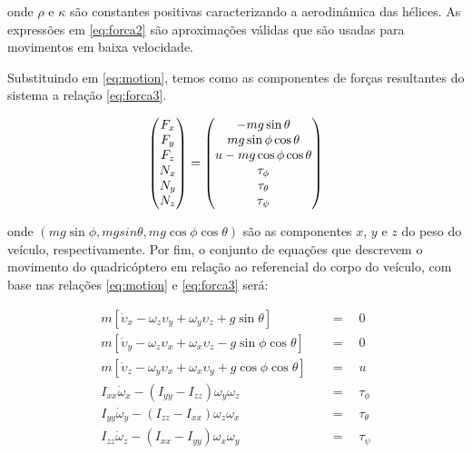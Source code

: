 \documentclass[a4paper, 12pt]{article}
\begin{document}
\noindent onde $\rho$ e $\kappa$ são constantes positivas caracterizando a aerodinâmica das hélices. As expressões em \ref{eq:forca2} são aproximações válidas que são usadas para movimentos em baixa velocidade. 

Substituindo em \ref{eq:motion}, temos como as componentes de forças resultantes do sistema a relação \ref{eq:forca3}. 

\begin{equation}
\centering
\begin{pmatrix}
	F_x \\ F_y \\ F_z \\ N_x \\ N_y \\ N_z 
\end{pmatrix} = 
\begin{pmatrix}
-mg\sin{\theta} \\ mg\sin{\phi}\cos{\theta} \\ u - mg\cos{\phi}\cos{\theta} \\ \tau_{\phi} \\ \tau_{\theta} \\ \tau_{\psi} 
\end{pmatrix}
\label{eq:forca3}
\end{equation}

\noindent onde $(mg\sin{\phi},mgsin{\theta},mg\cos{\phi}\cos{\theta})$ são as componentes $x$, $y$ e $z$ do peso do veículo, respectivamente. Por fim, o conjunto de equações que descrevem o movimento do quadricóptero em relação ao referencial do corpo do veículo, com base nas relações \ref{eq:motion} e \ref{eq:forca3} será:

\begin{equation}
\begin{aligned}
	m\left[ { \dot { \upsilon  }  }_{ x } - { \omega  }_{ z }\upsilon_{ y } + { \omega  }_{ y }{ \upsilon  }_{ z } + g\sin{\theta} \right] \quad &=\quad 0 \\ 
	m\left[ { \dot { \upsilon  }  }_{ y } - { \omega  }_{ z }\upsilon_{ x } + { \omega  }_{ x }{ \upsilon  }_{ z } - g\sin{\phi}\cos{\theta} \right] \quad &=\quad 0 \\
	m\left[ { \dot { \upsilon  }  }_{ z } - { \omega  }_{ y }\upsilon_{ x } + { \omega  }_{ x }{ \upsilon  }_{ y } + g\cos{\phi}\cos{\theta} \right] \quad &=\quad u \\ 
	{ I }_{ xx }{ \dot { \omega  }  }_{ x } - (I_{ yy } - I_{ zz }){ \omega  }_{ y }{ \omega  }_{ z }\quad &=\quad \tau_{\phi} \\
	{ I }_{ yy }{ \dot { \omega  }  }_{ y } - (I_{ zz } - I_{ xx }){ \omega  }_{ z }{ \omega  }_{ x }\quad &=\quad \tau_{\theta}\\
	{ I }_{ zz }{ \dot { \omega  }  }_{ z } - (I_{ xx } - I_{ yy }){ \omega  }_{ x }{ \omega  }_{ y }\quad &=\quad \tau_{\psi} 
\end{aligned}
\label{eq:forca4}
\end{equation}
\end{document}
